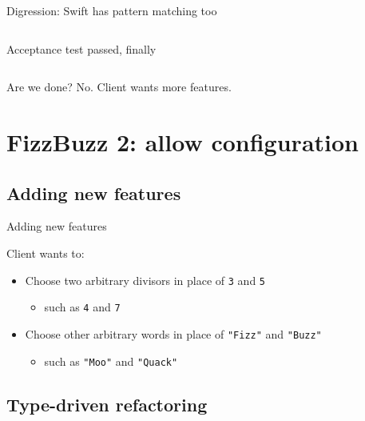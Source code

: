 \begin{frame}[fragile]{Digression: Swift has pattern matching too}
  \inputminted{ocaml}{FizzBuzz2.swift}
\end{frame}

\begin{frame}[fragile]{Acceptance test passed, finally}

  \inputminted{console}{testQuick5.console}

  \begin{block}{Are we done?}
    No. Client wants more features.
  \end{block}
\end{frame}

\section{FizzBuzz 2: allow configuration}

\subsection{Adding new features}

\begin{frame}{Adding new features}
  \begin{block}{Client wants to:}
    \begin{itemize}
    \item Choose two \alert{arbitrary} divisors in place of \texttt{3} and \texttt{5}
      \begin{itemize}
      \item such as \texttt{4} and \texttt{7}
      \end{itemize}
    \item Choose other \alert{arbitrary} words in place of \texttt{"Fizz"} and \texttt{"Buzz"}
      \begin{itemize}
      \item such as \texttt{"Moo"} and \texttt{"Quack"}

      \end{itemize}
    \end{itemize}
  \end{block}
\end{frame}

\subsection{Type-driven refactoring}


